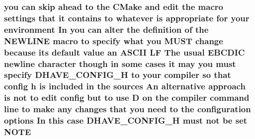 \subsubsection[{\texorpdfstring{N\+O\+TE}{NOTE}}]{\setlength{\rightskip}{0pt plus 5cm}you {\bf can} {\bf skip} ahead {\bf to} the C\+Make and edit the macro settings that {\bf it} {\bf contains} {\bf to} whatever {\bf is} appropriate for your {\bf environment} In you {\bf can} alter the definition {\bf of} the {\bf N\+E\+W\+L\+I\+NE} macro {\bf to} specify {\bf what} you M\+U\+ST change because its {\bf default} {\bf value} an {\bf A\+S\+C\+II} {\bf LF} The usual E\+B\+C\+D\+IC {\bf newline} {\bf character} {\bf though} {\bf in} some {\bf cases} {\bf it} may you must specify D\+H\+A\+V\+E\+\_\+\+C\+O\+N\+F\+I\+G\+\_\+H {\bf to} your {\bf compiler} {\bf so} that config {\bf h} {\bf is} {\bf included} {\bf in} the sources An alternative approach {\bf is} {\bf not} {\bf to} edit config but {\bf to} use {\bf D} {\bf on} the {\bf compiler} {\bf command} {\bf line} {\bf to} {\bf make} {\bf any} changes that you need {\bf to} the configuration {\bf options} In {\bf this} {\bf case} D\+H\+A\+V\+E\+\_\+\+C\+O\+N\+F\+I\+G\+\_\+H must {\bf not} {\bf be} {\bf set} N\+O\+TE}\hypertarget{NON-AUTOTOOLS-BUILD_8txt_a78301bb4ab06ade715a4c36dee3e57e5}{}\label{NON-AUTOTOOLS-BUILD_8txt_a78301bb4ab06ade715a4c36dee3e57e5}
